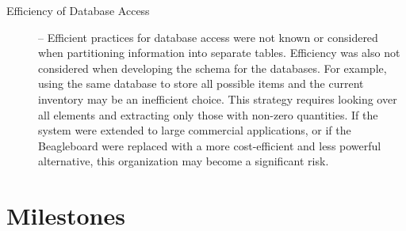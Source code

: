 \documentclass[11pt]{article} %
\begin{document}
\begin{description}
\item[Efficiency of Database Access] -- Efficient practices for database access were not known or considered when partitioning information into separate tables. Efficiency was also not considered when developing the schema for the databases. For example, using the same database to store all possible items and the current inventory may be an inefficient choice. This strategy requires looking over all elements and extracting only those with non-zero quantities. If the system were extended to large commercial applications, or if the Beagleboard were replaced with a more cost-efficient and less powerful alternative, this organization may become a significant risk.
\end{description}
\pagebreak
\section{Milestones}
\end{document}
